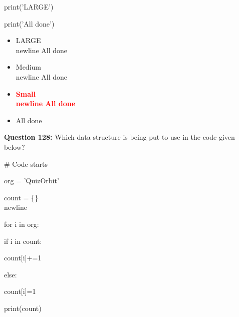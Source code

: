 \documentclass[12pt,a4paper]{article}
\begin{document}
\newline
    print('LARGE')\newline

\newline
print('All done')

\begin{itemize}
    \item[\textbf{A.}] LARGE\\newline All done
    \item[\textbf{B.}] Medium\\newline All done
    \item[\textbf{C.}] \textcolor{red}{\textbf{Small\\newline All done}}
    \item[\textbf{D.}] All done
\end{itemize}

\vspace{0.5cm}

\textbf{Question 128:} Which data structure is being put to use in the code given below?\newline

\newline
\newline

\newline
# Code starts\newline

\newline
org = 'QuizOrbit'\newline

\newline
count = \{\}\\newline

\newline
for i in org:\newline

\newline
    if i in count:\newline

\newline
        count[i]+=1\newline

\newline
    else:\newline

\newline
        count[i]=1\newline

\newline
print(count)\newline
\end{document}
